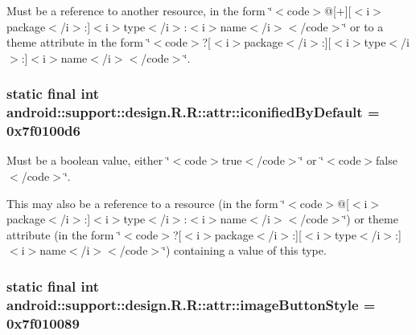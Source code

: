 Must be a reference to another resource, in the form \char`\"{}$<$code$>$@\mbox{[}+\mbox{]}\mbox{[}$<$i$>$package$<$/i$>$:\mbox{]}$<$i$>$type$<$/i$>$:$<$i$>$name$<$/i$>$$<$/code$>$\char`\"{} or to a theme attribute in the form \char`\"{}$<$code$>$?\mbox{[}$<$i$>$package$<$/i$>$:\mbox{]}\mbox{[}$<$i$>$type$<$/i$>$:\mbox{]}$<$i$>$name$<$/i$>$$<$/code$>$\char`\"{}. \hypertarget{classandroid_1_1support_1_1design_1_1_r_1_1attr_93b594d69376026a4d3712dc832b0069}{
\subsubsection[{iconifiedByDefault}]{\setlength{\rightskip}{0pt plus 5cm}static final int android::support::design.R.R::attr::iconifiedByDefault = 0x7f0100d6}}
\label{classandroid_1_1support_1_1design_1_1_r_1_1attr_93b594d69376026a4d3712dc832b0069}


Must be a boolean value, either \char`\"{}$<$code$>$true$<$/code$>$\char`\"{} or \char`\"{}$<$code$>$false$<$/code$>$\char`\"{}. 

This may also be a reference to a resource (in the form \char`\"{}$<$code$>$@\mbox{[}$<$i$>$package$<$/i$>$:\mbox{]}$<$i$>$type$<$/i$>$:$<$i$>$name$<$/i$>$$<$/code$>$\char`\"{}) or theme attribute (in the form \char`\"{}$<$code$>$?\mbox{[}$<$i$>$package$<$/i$>$:\mbox{]}\mbox{[}$<$i$>$type$<$/i$>$:\mbox{]}$<$i$>$name$<$/i$>$$<$/code$>$\char`\"{}) containing a value of this type. \hypertarget{classandroid_1_1support_1_1design_1_1_r_1_1attr_1fdbd688c434e041812937fa3f3cfc83}{
\subsubsection[{imageButtonStyle}]{\setlength{\rightskip}{0pt plus 5cm}static final int android::support::design.R.R::attr::imageButtonStyle = 0x7f010089}}
\label{classandroid_1_1support_1_1design_1_1_r_1_1attr_1fdbd688c434e041812937fa3f3cfc83}


